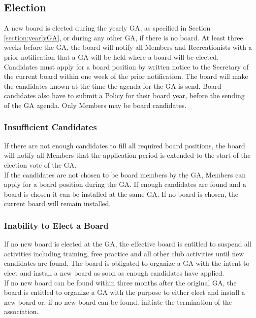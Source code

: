 \documentclass[a4paper]{article}
\begin{document}
\subsection{Election}
A new board is elected during the yearly { GA}, as specified in Section \ref{section:yearlyGA}, or during any other { GA}, if there is no board. At least three weeks before the { GA}, the board will notify all { Members} and { Recreationists} with a prior notification that a { GA} will be held where a board will be elected. Candidates must apply for a board position by written notice to the Secretary of the current board within one week of the prior notification. The board will make the candidates known at the time the agenda for the { GA} is send. Board candidates also have to submit a Policy for their board year, before the sending of the { GA} agenda. Only { Members} may be board candidates.

\subsubsection{Insufficient Candidates}

If there are not enough candidates to fill all required board positions, the board will notify all { Members} that the application period is extended to the start of the election vote of the { GA}. \\

If the candidates are not chosen to be board members by the { GA}, { Members} can apply for a board position during the { GA}. If enough candidates are found and a board is chosen it can be installed at the same { GA}. If no board is chosen, the current board will remain installed.

\subsubsection{Inability to Elect a Board}

If no new board is elected at the { GA}, the effective board is entitled to suspend all activities including training, free practice and all other club activities until new candidates are found. The board is obligated to organize a { GA} with the intent to elect and install a new board as soon as enough candidates have applied. \\

If no new board can be found within three months after the original { GA}, the board is entitled to organize a { GA} with the purpose to either elect and install a new board or, if no new board can be found, initiate the termination of the association.
\end{document}
